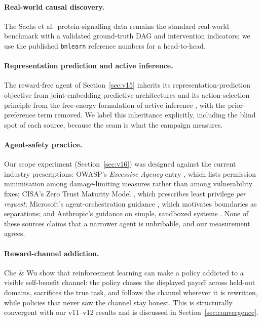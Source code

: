 \documentclass[11pt]{article}
\newcommand{\code}[1]{\texttt{\small #1}}
\begin{document}
\paragraph{Real-world causal discovery.}
The Sachs et al.\ protein-signalling data \cite{sachs2005causal} remains the standard
real-world benchmark with a validated ground-truth DAG and intervention indicators;
we use the published \code{bnlearn} reference numbers \cite{scutari2010bnlearn} for a
head-to-head.

\paragraph{Representation prediction and active inference.}
The reward-free agent of Section~\ref{sec:v15} inherits its representation-prediction
objective from joint-embedding predictive architectures \cite{assran2023ijepa} and its
action-selection principle from the free-energy formulation of active inference
\cite{friston2010fep,mazzaglia2021active}, with the prior-preference term removed. We
label this inheritance explicitly, including the blind spot of each source, because
the seam is what the campaign measures.

\paragraph{Agent-safety practice.}
Our scope experiment (Section~\ref{sec:v16}) was designed against the current
industry prescriptions: OWASP's \emph{Excessive Agency} entry
\cite{owasp2025llm06}, which lists permission minimisation among damage-limiting
measures rather than among vulnerability fixes; CISA's Zero Trust Maturity Model
\cite{cisa2023ztmm}, which prescribes least privilege \emph{per request}; Microsoft's
agent-orchestration guidance \cite{microsoft2025orchestration}, which motivates
boundaries as separations; and Anthropic's guidance on simple, sandboxed systems
\cite{anthropic2024building}. None of these sources claims that a narrower agent is
unbribable, and our measurement agrees.

\paragraph{Reward-channel addiction.}
Che \& Wu \cite{che2026greed} show that reinforcement learning can make a policy
addicted to a visible self-benefit channel: the policy chases the displayed payoff
across held-out domains, sacrifices the true task, and follows the channel wherever
it is rewritten, while policies that never saw the channel stay honest. This is
structurally convergent with our v11--v12 results and is discussed in
Section~\ref{sec:convergence}.
\end{document}
